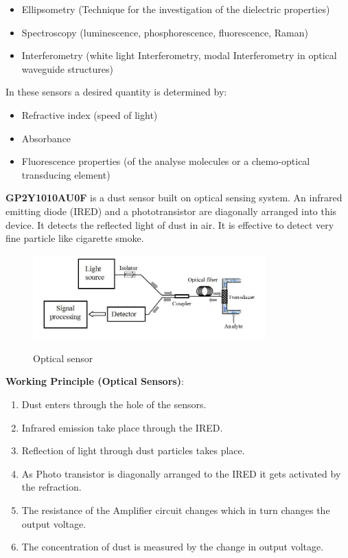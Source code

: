 \begin{enumerate}
	\begin{itemize}
		\item Ellipsometry (Technique for the investigation of the dielectric properties)
		\item Spectroscopy (luminescence, phosphorescence, fluorescence, Raman)
		\item Interferometry (white light Interferometry, modal Interferometry in optical waveguide structures)
	\end{itemize}

	In these sensors a desired quantity is determined by:
	\begin{itemize}
		\item Refractive index (speed of light)
		\item Absorbance
		\item Fluorescence properties (of the analyse molecules or a chemo-optical transducing element)
	\end{itemize}

	\textbf{GP2Y1010AU0F} is a dust sensor built on optical sensing system. An infrared emitting diode (IRED) and a phototransistor are diagonally arranged into this device. It detects the reflected light of dust in air. It is effective to detect very fine particle like cigarette smoke.
\begin{figure}
\centering
\includegraphics[width=0.8\textwidth]{./optical}\\[0.1in]
\label{fig: Optical sensor}
\caption{Optical sensor}
\end{figure}

	\textbf{Working Principle (Optical Sensors)}:
	\begin{enumerate}
		\item Dust enters through the hole of the sensors.
		\item Infrared emission take place through the IRED.
		\item Reflection of light through dust particles takes place.
		\item As Photo transistor is diagonally arranged to the IRED it gets activated by the refraction. 
		\item The resistance of the Amplifier circuit changes which in turn changes the output voltage.
		\item The concentration of dust is measured by the change in output voltage. 
	\end{enumerate}

\end{enumerate}

